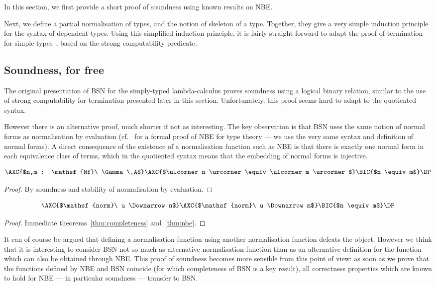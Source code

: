 \documentclass[a4paper,english]{lipics-v2019}
\newcommand{\agdaSymb}[1]{\mathsf{#1}}
\newcommand{\Nf}{\agdaSymb{Nf}}
\newcommand{\norm}{\agdaSymb{norm}}
\newcommand{\cul}{\ulcorner}
\newcommand{\cur}{\urcorner}
\newcommand{\Da}{\Downarrow}
\begin{document}
In this section, we first provide a short proof of soundness using known results
on NBE.

Next, we define a partial normalisation of types, and the notion of skeleton of
a type. Together, they give a very simple induction principle for the syntax of
dependent types. Using this simplified induction principle, it is fairly straight
forward to adapt the proof of termination for simple types~\cite{chapman2009bsn},
based on the strong computability predicate.

\subsection{Soundness, for free}
The original presentation of BSN for the simply-typed lambda-calculus proves
soundness using a logical binary relation, similar to the use of strong
computability for termination presented later in this section. Unfortunately,
this proof seems hard to adapt to the quotiented syntax.

However there is an alternative proof, much shorter if not as interesting.
The key observation is that BSN uses the same notion of normal forms as
normalisation by evaluation (cf.~\cite{kaposi2016normalisation} for a formal
proof of NBE for type theory --- we use the very same syntax and definition of
normal forms). A direct consequence of the existence of a normalisation function
such as NBE is that there is exactly one normal form in each equivalence class
of terms, which in the quotiented syntax means that the embedding of normal
forms is injective.
\begin{theorem}
  \label{thm:nbe}
  \[ \AXC{$n,m : \Nf\ \Gamma\ A$}\AXC{$\cul n \cur \equiv \cul m \cur$}\BIC{$n \equiv m$}\DP \]
\end{theorem}
\begin{proof}
  By soundness and stability of normalisation by evaluation.
\end{proof}

\begin{theorem}[Soundness]
  \label{thm:soundness}
  \[ \AXC{$\norm\ u \Da n$}\AXC{$\norm\ u \Da m$}\BIC{$n \equiv m$}\DP \]
\end{theorem}
\begin{proof}
  Immediate theorems~\ref{thm:completeness} and~\ref{thm:nbe}.
\end{proof}

It can of course be argued that defining a normalisation function using another
normalisation function defeats the object. However we think that it is interesting
to consider BSN not so much as alternative normalisation function than as an
alternative definition for the function which can also be obtained through NBE.
This proof of soundness becomes more sensible from this point of view: as soon
as we prove that the functions defined by NBE and BSN coincide (for which
completeness of BSN is a key result), all correctness properties which are known
to hold for NBE --- in particular soundness --- transfer to BSN.
\end{document}

